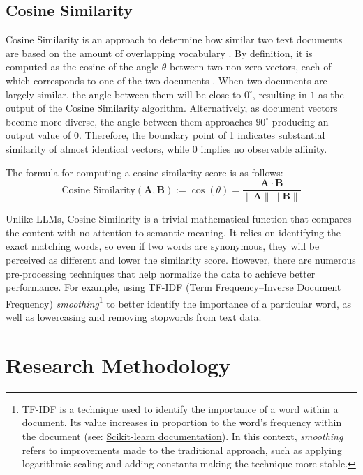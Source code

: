 \documentclass[conference]{IEEEtran}
\begin{document}
\subsection{Cosine Similarity}

Cosine Similarity is an approach to determine how similar two text documents are based on the amount of overlapping vocabulary \cite{lahitani2016cosine}. By definition, it is computed as the cosine of the angle $\theta$ between two non-zero vectors, each of which corresponds to one of the two documents \cite{desku2021cosine}. When two documents are largely similar, the angle between them will be close to $0^{\circ}$, resulting in $1$ as the output of the Cosine Similarity algorithm. Alternatively, as document vectors become more diverse, the angle between them approaches $90^{\circ}$ producing an output value of $0$. Therefore, the boundary point of 1 indicates substantial similarity of almost identical vectors, while 0 implies no observable affinity. 

The formula for computing a cosine similarity score is as follows:
\[
\text{Cosine Similarity}(\mathbf{A}, \mathbf{B}) := \cos(\theta) = \frac{\mathbf{A} \cdot \mathbf{B}}{\|\mathbf{A}\| \|\mathbf{B}\|}
\]

Unlike LLMs, Cosine Similarity is a trivial mathematical function that compares the content with no attention to semantic meaning. It relies on identifying the exact matching words, so even if two words are synonymous, they will be perceived as different and lower the similarity score.
However, there are numerous pre-processing techniques that help normalize the data to achieve better performance. For example, using TF-IDF (Term Frequency–Inverse Document Frequency) \textit{smoothing}\footnote{TF-IDF is a technique used to identify the importance of a word within a document. Its value increases in proportion to the word’s frequency within the document (see: \href{https://tinyurl.com/mrfebkkt}{Scikit-learn documentation}). In this context, \textit{smoothing} refers to improvements made to the traditional approach, such as applying logarithmic scaling and adding constants making the technique more stable.} to better identify the importance of a particular word, as well as lowercasing and removing stopwords from text data.

\section{Research Methodology}\label{sec:method}
\end{document}
